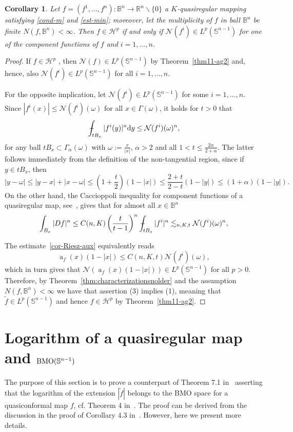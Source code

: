 \documentclass[11pt,a4paper,reqno]{amsart}
\newtheorem{cor}[theorem]{Corollary}
\theoremstyle{definition}
\def\vint{\mathop{\mathchoice%
          {\setbox0\hbox{$\displaystyle\intop$}\kern 0.22\wd0%
           \vcenter{\hrule width 0.6\wd0}\kern -0.82\wd0}%
          {\setbox0\hbox{$\textstyle\intop$}\kern 0.2\wd0%
           \vcenter{\hrule width 0.6\wd0}\kern -0.8\wd0}%
          {\setbox0\hbox{$\scriptstyle\intop$}\kern 0.2\wd0%
           \vcenter{\hrule width 0.6\wd0}\kern -0.8\wd0}%
          {\setbox0\hbox{$\scriptscriptstyle\intop$}\kern 0.2\wd0%
           \vcenter{\hrule width 0.6\wd0}\kern -0.8\wd0}}%
          \mathopen{}\int}
\renewcommand{\a}{\operatorname{a}}
\newcommand{\om}{\omega}
\newcommand{\B}{\mathbb{B}^n}
\newcommand{\Nm}{\mathcal{N}}
\newcommand{\R}{\mathbb{R}}
\newcommand{\ud}{\mathrm {d}}
\newcommand{\Sn}{\mathbb{S}^{n-1}}
\numberwithin{komcounter}{section}
\begin{document}
\begin{cor}\label{cor-Riesz} Let $f=(f^1,\ldots,f^n):\B\rightarrow \R^n\backslash\{ 0\}$ a $K$-quasiregular mapping satisfying \eqref{cond-m} and \eqref{est-min}; moreover, let the multiplicity of $f$ in ball $\B$ be finite $N(f,\B)<\infty$. Then $f\in \mathcal{H}^p$ if and only if $\Nm(f^i)\in L^p(\Sn)$ for one of the component functions of $f$ and $i=1,\ldots, n$.
\end{cor}
\begin{proof}
 If $f\in \mathcal{H}^p$ , then $\Nm(f)\in L^p(\Sn)$ by Theorem~\ref{thm11-ag2} and, hence, also $\Nm(f^i)\in L^p(\Sn)$ for all $i=1,\ldots, n$.
 
 For the opposite implication, let $\Nm(f^i)\in L^p(\Sn)$ for some $i=1,\ldots, n$. Since $|f^i(x)|\leq \Nm(f^i)(\omega)$ for all $x\in\Gamma (\omega)$, it holds for $t>0$ that
\[
\vint_{tB_x} |f^i(y)|^n\ud y\leq \Nm(f^i)(\omega )^n,
\]
for any ball $tB_x\subset \Gamma_{\alpha}(\omega)$ with $\om:=\frac{x}{|x|}$, $\alpha>2$ and all $1<t\leq \frac{2\alpha}{2+\alpha}$. The latter follows immediately from the definition of the non-tangential region, since if $y\in tB_x$, then
\[
 |y-\om|\leq |y-x|+|x-\om|\leq (1+\frac{t}{2})(1-|x|)\leq \frac{2+t}{2-t}(1-|y|)\leq (1+\alpha)(1-|y|).
\]
On the other hand, the Caccioppoli inequality for component functions of a quasiregular map, see~\cite[Proposition 2.6]{no}, gives that 
 for almost all $x\in \B$
\begin{equation}\label{cor-Riesz-aux}
\int_{B_x} |Df|^n\leq C(n, K) \left(\frac{t}{t-1}\right)^n \vint_{t B_x} |f^i|^n \lesssim_{n, K, t} \Nm(f^i)(\omega )^n,
\end{equation}

The estimate~\eqref{cor-Riesz-aux} equivalently reads 
\[
\a_f(x)(1-|x|)\leq C(n, K, t) \Nm(f^i)(\omega ),
\]
 which in turn gives that $\Nm(\a_f(x)(1-|x|))\in L^p(\Sn)$ for all $p>0$. Therefore, by Theorem~\ref{thm:characterizationsnolder} and the assumption $N(f,\B)<\infty$ we have that assertion (3) implies (1), meaning that $\tilde{f}\in L^p(\Sn)$ and hence $f\in \mathcal{H}^p$ by Theorem~\ref{thm11-ag2}.
\end{proof}

\section{Logarithm of a quasiregular map and ${\rm BMO}(\Sn)$}

The purpose of this section is to prove a counterpart of Theorem 7.1 in~\cite{ak} asserting that the logarithm of the extension $|\tilde{f}|$ belongs to the BMO space for a quasiconformal map $f$, cf. Theorem 4 in~\cite{j}. The proof can be derived from the discussion in the proof of Corollary 4.3 in~\cite{ag2}. However, here we present more details.
\end{document}
